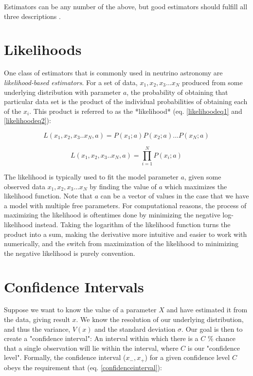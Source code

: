 Estimators can be any number of the above, but good estimators should fulfill all three descriptions \cite{barlow_1989}. 

\section{Likelihoods}
One class of estimators that is commonly used in neutrino astronomy are \textit{likelihood-based estimators}. For a set of data, {$x_1, x_2, x_3 ...x_N$} produced from some underlying distribution with parameter $a$, the probability of obtaining that particular data set is the product of the individual probabilities of obtaining each of the $x_i$. This product is referred to as the *likelihood* (eq. \ref{likelihoodeq1} and \ref{likelihoodeq2}):

\begin{equation}
    L(x_1, x_2, x_3..x_N, a) = P(x_1;a)P(x_2;a)...P(x_N;a)
\label{likelihoodeq1}
\end{equation}

\begin{equation}
    L(x_1, x_2, x_3..x_N, a) = \prod_{i=1}^N P(x_i;a)
\label{likelihoodeq2}
\end{equation}

The likelihood is typically used to fit the model parameter $a$, given some observed data {$x_1, x_2, x_3 ...x_N$} by finding the value of $a$ which maximizes the likelihood function. Note that $a$ can be a vector of values in the case that we have a model with multiple free parameters. For computational reasons, the process of maximizing the likelihood is oftentimes done by minimizing the negative log-likelihood instead. Taking the logarithm of the likelihood function turns the product into a sum, making the derivative more intuitive and easier to work with numerically, and the switch from maximization of the likelihood to minimizing the negative likelihood is purely convention. 

\section{Confidence Intervals}
Suppose we want to know the value of a parameter $X$ and have estimated it from the data, giving result $x$. We know the resolution of our underlying distribution, and thus the variance, $V(x)$ and the standard deviation $\sigma$. Our goal is then to create a "confidence interval": An interval within which there is a $C$ \% chance that a single observation will lie within the interval, where $C$ is our "confidence level". Formally, the confidence interval ($x_-, x_+$) for a given confidence level $C$ obeys the requirement that (eq. \ref{confidenceinterval}):

